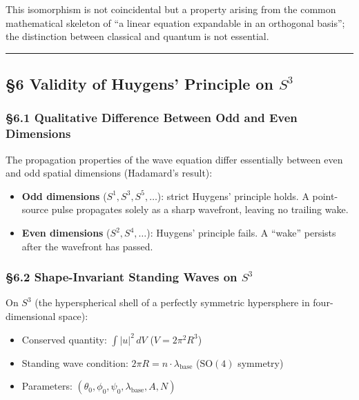 \documentclass[
  a4paper,11pt]{article}
\providecommand{\tightlist}{%
  \setlength{\itemsep}{0pt}\setlength{\parskip}{0pt}}
\theoremstyle{definition}
\theoremstyle{remark}
\begin{document}
This isomorphism is not coincidental but a property arising from the
common mathematical skeleton of ``a linear equation expandable in an
orthogonal basis''; the distinction between classical and quantum is not
essential.

\begin{center}\rule{0.5\linewidth}{0.5pt}\end{center}

\subsection{\texorpdfstring{§6 Validity of Huygens' Principle on
\(S^3\)}{§6 Validity of Huygens' Principle on S\^{}3}}\label{validity-of-huygens-principle-on-s3}

\subsubsection{§6.1 Qualitative Difference Between Odd and Even
Dimensions}\label{qualitative-difference-between-odd-and-even-dimensions}

The propagation properties of the wave equation differ essentially
between even and odd spatial dimensions (Hadamard's result):

\begin{itemize}
\tightlist
\item
  \textbf{Odd dimensions} (\(S^1, S^3, S^5, \ldots\)): strict Huygens'
  principle holds. A point-source pulse propagates solely as a sharp
  wavefront, leaving no trailing wake.
\item
  \textbf{Even dimensions} (\(S^2, S^4, \ldots\)): Huygens' principle
  fails. A ``wake'' persists after the wavefront has passed.
\end{itemize}

\subsubsection{\texorpdfstring{§6.2 Shape-Invariant Standing Waves on
\(S^3\)}{§6.2 Shape-Invariant Standing Waves on S\^{}3}}\label{shape-invariant-standing-waves-on-s3}

On \(S^3\) (the hyperspherical shell of a perfectly symmetric
hypersphere in four-dimensional space):

\begin{itemize}
\tightlist
\item
  Conserved quantity: \(\int |u|^2 \, dV\) (\(V = 2\pi^2 R^3\))
\item
  Standing wave condition: \(2\pi R = n \cdot \lambda_{\text{base}}\)
  (\(\mathrm{SO}(4)\) symmetry)
\item
  Parameters:
  \((\theta_0, \phi_0, \psi_0, \lambda_{\text{base}}, A, N)\)
\end{itemize}
\end{document}
